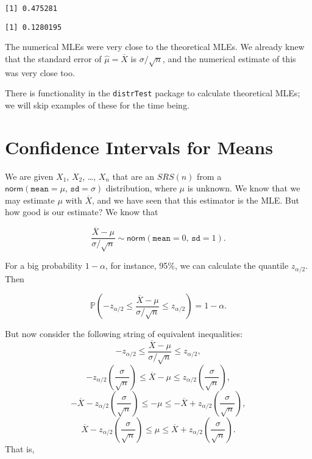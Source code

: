 \documentclass[]{book}
\numberwithin{equation}{chapter}
\numberwithin{figure}{chapter}
\theoremstyle{plain}
\theoremstyle{definition}
\theoremstyle{remark}
\theoremstyle{definition}
\theoremstyle{definition}
\theoremstyle{remark}
\begin{document}
\begin{verbatim}
[1] 0.475281
\end{verbatim}

\begin{verbatim}
[1] 0.1280195
\end{verbatim}

The numerical MLEs were very close to the theoretical MLEs. We already
knew that the standard error of \(\hat{\mu}=\overline{X}\) is
\(\sigma/\sqrt{n}\), and the numerical estimate of this was very close
too.

There is functionality in the \texttt{distrTest} package
\autocite{distrTest} to calculate theoretical MLEs; we will skip
examples of these for the time being.

\section{Confidence Intervals for
Means}\label{sec-confidence-intervals-for-means}

We are given \(X_{1}\), \(X_{2}\), \ldots{}, \(X_{n}\) that are an
\(SRS(n)\) from a
\(\mathsf{norm}(\mathtt{mean}=\mu,\,\mathtt{sd}=\sigma)\) distribution,
where \(\mu\) is unknown. We know that we may estimate \(\mu\) with
\(\overline{X}\), and we have seen that this estimator is the MLE. But
how good is our estimate? We know that

\begin{equation} 
\frac{\overline{X}-\mu}{\sigma/\sqrt{n}}\sim\mathsf{norm}(\mathtt{mean}=0,\,\mathtt{sd}=1).
\end{equation}

For a big probability \(1-\alpha\), for instance, 95\%, we can calculate
the quantile \(z_{\alpha/2}\). Then

\begin{equation}
\mathbb{P}\left(-z_{\alpha/2}\leq\frac{\overline{X}-\mu}{\sigma/\sqrt{n}}\leq z_{\alpha/2}\right)=1-\alpha.
\end{equation}

But now consider the following string of equivalent inequalities: \[
-z_{\alpha/2}\leq\frac{\overline{X}-\mu}{\sigma/\sqrt{n}}\leq z_{\alpha/2},
\] \[
-z_{\alpha/2}\left(\frac{\sigma}{\sqrt{n}}\right)\leq\overline{X}-\mu\leq z_{\alpha/2}\left(\frac{\sigma}{\sqrt{n}}\right),
\] \[
-\overline{X} - z_{\alpha/2}\left(\frac{\sigma}{\sqrt{n}}\right)\leq - \mu \leq - \overline{X} + z_{\alpha/2} \left( \frac{\sigma}{\sqrt{n}} \right),
\] \[
\overline{X} - z_{\alpha/2} \left( \frac{\sigma}{\sqrt{n}} \right) \leq \mu \leq \overline{X} + z_{\alpha/2} \left( \frac{\sigma}{\sqrt{n}} \right).
\] That is,
\end{document}

